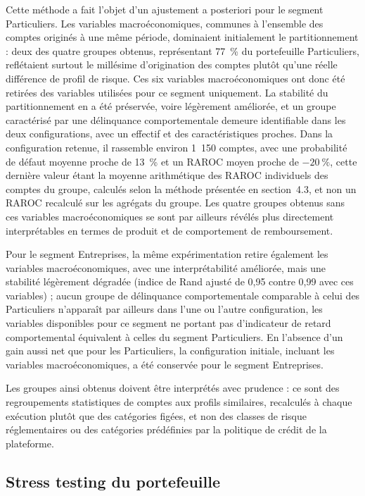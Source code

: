 Cette méthode a fait l'objet d'un ajustement a posteriori pour le segment Particuliers. Les variables macroéconomiques, communes à l'ensemble des comptes originés à une même période, dominaient initialement le partitionnement : deux des quatre groupes obtenus, représentant 77~\% du portefeuille Particuliers, reflétaient surtout le millésime d'origination des comptes plutôt qu'une réelle différence de profil de risque. Ces six variables macroéconomiques ont donc été retirées des variables utilisées pour ce segment uniquement. La stabilité du partitionnement en a été préservée, voire légèrement améliorée, et un groupe caractérisé par une délinquance comportementale demeure identifiable dans les deux configurations, avec un effectif et des caractéristiques proches. Dans la configuration retenue, il rassemble environ 1~150 comptes, avec une probabilité de défaut moyenne proche de 13~\% et un RAROC moyen proche de $-20~\%$, cette dernière valeur étant la moyenne arithmétique des RAROC individuels des comptes du groupe, calculés selon la méthode présentée en section~4.3, et non un RAROC recalculé sur les agrégats du groupe. Les quatre groupes obtenus sans ces variables macroéconomiques se sont par ailleurs révélés plus directement interprétables en termes de produit et de comportement de remboursement.

Pour le segment Entreprises, la même expérimentation retire également les variables macroéconomiques, avec une interprétabilité améliorée, mais une stabilité légèrement dégradée (indice de Rand ajusté de 0,95 contre 0,99 avec ces variables) ; aucun groupe de délinquance comportementale comparable à celui des Particuliers n'apparaît par ailleurs dans l'une ou l'autre configuration, les variables disponibles pour ce segment ne portant pas d'indicateur de retard comportemental équivalent à celles du segment Particuliers. En l'absence d'un gain aussi net que pour les Particuliers, la configuration initiale, incluant les variables macroéconomiques, a été conservée pour le segment Entreprises.

Les groupes ainsi obtenus doivent être interprétés avec prudence : ce sont des regroupements statistiques de comptes aux profils similaires, recalculés à chaque exécution plutôt que des catégories figées, et non des classes de risque réglementaires ou des catégories prédéfinies par la politique de crédit de la plateforme.

\subsection{Stress testing du portefeuille}

